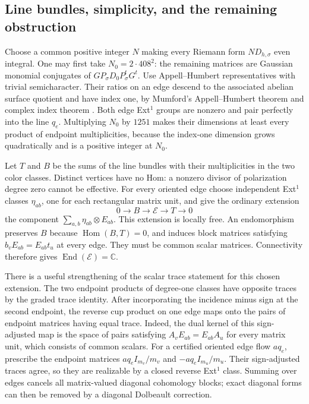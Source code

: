 \documentclass[11pt]{article}
\theoremstyle{definition}
\theoremstyle{remark}
\begin{document}
\subsection{Line bundles, simplicity, and the remaining obstruction}

Choose a common positive integer \(N\) making every Riemann form
\(ND_{h,\sigma}\) even integral.  One may first take
\(N_0=2\cdot408^2\): the remaining matrices are Gaussian
monomial conjugates of \(G P_\sigma D_0P_\sigma^tG^t\).
Use Appell--Humbert representatives with trivial semicharacter.
Their ratios on an edge descend to the associated abelian surface
quotient and have index one, by Mumford's Appell--Humbert theorem
and complex index theorem \cite[\S2, p.~20; \S16, pp.~150,162]{MumfordAV}.
Both edge Ext\({}^1\) groups are nonzero and pair perfectly into
the line \(q_e\).  Multiplying \(N_0\) by \(1251\) makes their
dimensions at least every product of endpoint multiplicities,
because the index-one dimension grows quadratically and is a
positive integer at \(N_0\).

Let \(T\) and \(B\) be the sums of the line bundles with their
multiplicities in the two color classes.  Distinct vertices have
no Hom: a nonzero divisor of polarization degree zero cannot be
effective.  For every oriented edge choose independent Ext\({}^1\)
classes \(\eta_{ab}\), one for each rectangular matrix unit, and
give the ordinary extension
\[
 0\longrightarrow B\longrightarrow\mathcal E\longrightarrow T
 \longrightarrow0
\]
the component \(\sum_{a,b}\eta_{ab}\otimes E_{ab}\).
This extension is locally free.  An endomorphism preserves \(B\)
because \(\operatorname{Hom}(B,T)=0\), and induces block matrices
satisfying \(b_vE_{ab}=E_{ab}t_u\) at every edge.  They must be
common scalar matrices.  Connectivity therefore gives
\(\operatorname{End}(\mathcal E)=\mathbb C\).

There is a useful strengthening of the scalar trace statement for
this chosen extension.  The two endpoint products of degree-one
classes have opposite traces by the graded trace identity.  After
incorporating the incidence minus sign at the second endpoint,
the reverse cup product on one edge maps onto the pairs of endpoint
matrices having equal trace.  Indeed, the dual kernel of this
sign-adjusted map is the space of pairs satisfying
\(A_vE_{ab}=E_{ab}A_u\) for every matrix unit, which consists of
common scalars.  For a certified oriented edge flow \(a q_e\),
prescribe the endpoint matrices
\(a q_e I_{m_v}/m_v\) and \(-a q_e I_{m_u}/m_u\).
Their sign-adjusted traces agree, so they are realizable by a
closed reverse Ext\({}^1\) class.  Summing over edges cancels
all matrix-valued diagonal cohomology blocks; exact diagonal forms
can then be removed by a diagonal Dolbeault correction.
\end{document}
